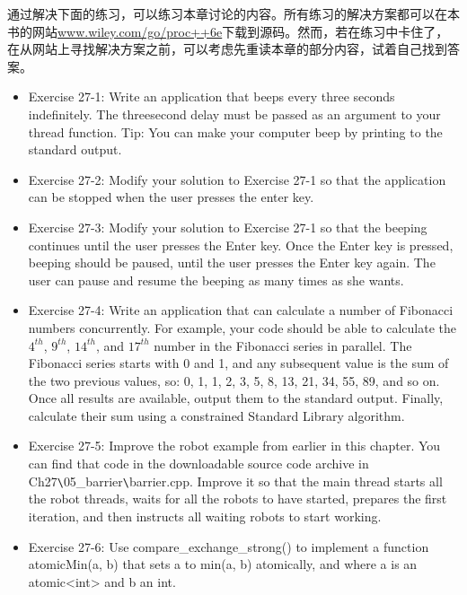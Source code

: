 通过解决下面的练习，可以练习本章讨论的内容。所有练习的解决方案都可以在本书的网站\url{www.wiley.com/go/proc++6e}下载到源码。然而，若在练习中卡住了，在从网站上寻找解决方案之前，可以考虑先重读本章的部分内容，试着自己找到答案。

\begin{itemize}
\item
Exercise 27-1: Write an application that beeps every three seconds indefinitely. The threesecond delay must be passed as an argument to your thread function. Tip: You can make your computer beep by printing \a to the standard output.

\item
Exercise 27-2: Modify your solution to Exercise 27-1 so that the application can be stopped when the user presses the enter key.

\item
Exercise 27-3: Modify your solution to Exercise 27-1 so that the beeping continues until the user presses the Enter key. Once the Enter key is pressed, beeping should be paused, until the user presses the Enter key again. The user can pause and resume the beeping as many times as she wants.

\item
Exercise 27-4: Write an application that can calculate a number of Fibonacci numbers concurrently. For example, your code should be able to calculate the $4^{th}$, $9^{th}$, $14^{th}$, and $17^{th}$ number in the Fibonacci series in parallel. The Fibonacci series starts with 0 and 1, and any subsequent value is the sum of the two previous values, so: 0, 1, 1, 2, 3, 5, 8, 13, 21, 34, 55, 89, and so on. Once all results are available, output them to the standard output. Finally, calculate their sum using a constrained Standard Library algorithm.

\item
Exercise 27-5: Improve the robot example from earlier in this chapter. You can find that code in the downloadable source code archive in Ch27\verb|\|05\_barrier\verb|\|barrier.cpp. Improve it so that the main thread starts all the robot threads, waits for all the robots to have started, prepares the first iteration, and then instructs all waiting robots to start working.

\item
Exercise 27-6: Use compare\_exchange\_strong() to implement a function atomicMin(a, b) that sets a to min(a, b) atomically, and where a is an atomic<int> and b an int.
\end{itemize}







